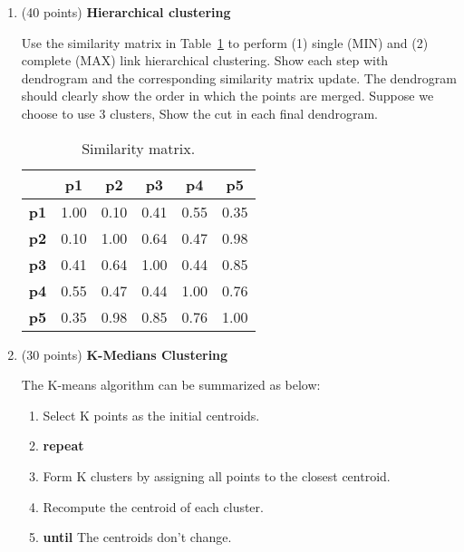 \documentclass[11pt]{article}
\begin{document}
\begin{enumerate}

    \item (40 points) \textbf{Hierarchical clustering}

    Use the similarity matrix in Table~\ref{tb:exp1} to perform
    (1) single (MIN) and (2) complete (MAX) link hierarchical
    clustering. Show each step with dendrogram and the
    corresponding similarity matrix update. The dendrogram should
    clearly show the order in which the points are merged.
    Suppose we choose to use 3 clusters, Show the cut in each
    final dendrogram.

    \begin{table}[ht]\label{tb:exp1}
        \centering
        \caption{Similarity matrix.}

        \begin{tabular}{ l| c | c | c | c | c}\hline
                   & \textbf{p1} & \textbf{p2} & \textbf{p3} & \textbf{p4} & \textbf{p5} \\ \hline
            \bf p1 & 1.00        & 0.10        & 0.41        & 0.55        & 0.35        \\
            \bf p2 & 0.10        & 1.00        & 0.64        & 0.47        & 0.98        \\
            \bf p3 & 0.41        & 0.64        & 1.00        & 0.44        & 0.85        \\
            \bf p4 & 0.55        & 0.47        & 0.44        & 1.00        & 0.76        \\
            \bf p5 & 0.35        & 0.98        & 0.85        & 0.76        & 1.00        \\
            \hline
        \end{tabular}
    \end{table}

    \item (30 points) \textbf{K-Medians Clustering}
    
    The K-means algorithm can be summarized as below:
    \begin{enumerate}
        \item Select K points as the initial centroids.
        \item \textbf{repeat}
        \item \;\;\;\; Form K clusters by assigning all points to the closest centroid.
        \item \;\;\;\; Recompute the centroid of each cluster.
        \item \textbf{until} The centroids don't change.
    \end{enumerate}


\end{enumerate}
\end{document}
